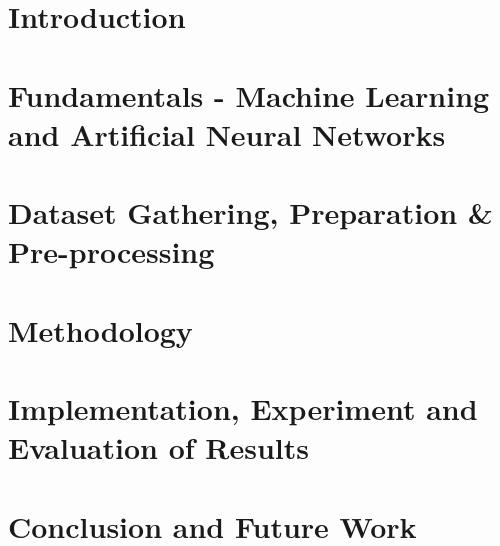 \documentclass[12pt,a4paper]{report}
\begin{document}






\tableofcontents
\listoffigures
\listoftables
\listoflistings
\newpage
{}

\chapter{Introduction}
\label{chap:1}


\chapter{Fundamentals - Machine Learning and Artificial Neural Networks}
\label{chap:2}


\chapter{Dataset Gathering, Preparation \& Pre-processing}
\label{chap:3}


\chapter{Methodology}
\label{chap:4}


\chapter{Implementation, Experiment and Evaluation of Results}
\label{chap:5}


\chapter{Conclusion and Future Work}
\label{chap:6}


\cleardoublepage
\begin{appendices}
\chapter{}

\end{appendices}


\end{document}
